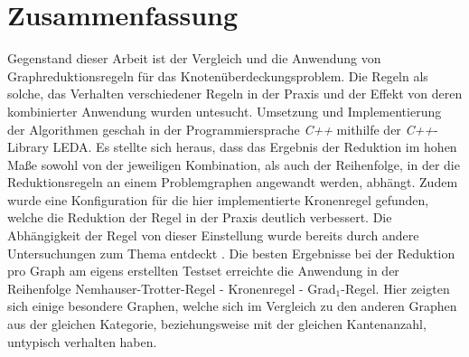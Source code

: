 \chapter*{Zusammenfassung}
Gegenstand dieser Arbeit ist der Vergleich und die Anwendung von Graphreduktionsregeln für das Knotenüberdeckungsproblem. Die Regeln als solche, das Verhalten verschiedener Regeln in der Praxis und der Effekt von deren kombinierter Anwendung wurden untesucht. Umsetzung und Implementierung der Algorithmen geschah in der Programmiersprache \emph{C++} mithilfe der \emph{C++}-Library LEDA. Es stellte sich heraus, dass das Ergebnis der Reduktion im hohen Maße sowohl von der jeweiligen Kombination, als auch der Reihenfolge, in der die Reduktionsregeln an einem Problemgraphen angewandt werden, abhängt. Zudem wurde eine Konfiguration für die hier implementierte Kronenregel gefunden, welche die Reduktion der Regel in der Praxis deutlich verbessert. Die Abhängigkeit der Regel von dieser Einstellung wurde bereits durch andere Untersuchungen zum Thema entdeckt \cite{paper:7}. Die besten Ergebnisse bei der Reduktion pro Graph am eigens erstellten Testset erreichte die Anwendung in der Reihenfolge Nemhauser-Trotter-Regel - Kronenregel - Grad$_{1}$-Regel. Hier zeigten sich einige besondere Graphen, welche sich im Vergleich zu den anderen Graphen aus der gleichen Kategorie, beziehungsweise mit der gleichen Kantenanzahl, untypisch verhalten haben. 
